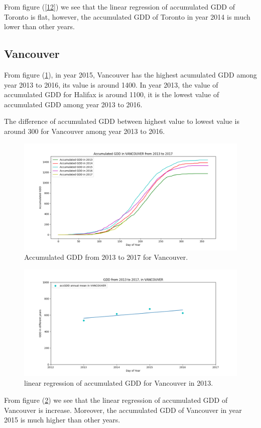 \documentclass[12pt]{article}
\begin{document}
From figure (\ref{12}) we see that the linear regression of accumulated GDD of Toronto is flat, however, the accumulated GDD of Toronto in year 2014 is much lower than other years.
\subsection{Vancouver}


From figure (\ref{15}), in year 2015, Vancouver has the highest acumulated GDD among year 2013 to 2016, its value is around 1400. In year 2013, the value of accumulated GDD for Halifax is around 1100, it is the lowest value of accumulated GDD among year 2013 to 2016. 

The difference of accumulated GDD between highest value to lowest value is around 300 for Vancouver among year 2013 to 2016.
\begin{center}
\begin{figure}[H]
\includegraphics[width=5.25in]{../Plot/VANCOUVER/accGDD_2013_2017.png}

\caption{Accumulated GDD from 2013 to 2017 for Vancouver.}
\label{15}
\end{figure}
\end{center}

\begin{center}
\begin{figure}[H]
\includegraphics[width=5.25in]{../Plot/VANCOUVER/GDD_LinearRegression_VANCOUVER.png}
\caption{linear regression of accumulated GDD for Vancouver in 2013.}
\label{16}
\end{figure}
\end{center}
From figure (\ref{16}) we see that the linear regression of accumulated GDD of Vancouver is increase. Moreover, the accumulated GDD of Vancouver in year 2015 is much higher than other years.
\end{document}
